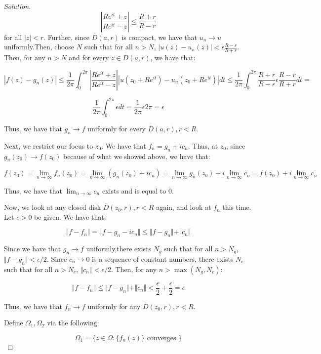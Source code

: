 \documentclass[10pt]{article}
\begin{document}
\begin{proof}[Solution]
$$  \left|  \frac{R e^{it} + z}{R e^{it} - z} \right| \leq \frac{R + r}{R - r} $$ for all $| z| < r$. Further, since $\overline{D}(a,r)$ is compact, we have that $u_n \to u$ uniformly.Then, choose $N$ such that for all $n > N$, $|u(z) - u_n(z)| < \epsilon \frac{R - r}{R + r}$. Then, for any $n > N$ and for every $z \in \overline{D}(a,r)$, we have that:

$$| f(z)  - g_n(z) | \leq  \frac{1}{2\pi}  \int_0^{2\pi} \left|  \frac{R e^{it} + z}{R e^{it} - z} \right| \left|  u(z_0 + Re^{it}) -  u_n(z_0 + Re^{it})\right| dt \leq \frac{1}{2\pi}  \int_0^{2\pi}  \frac{R + r}{R - r} \epsilon \frac{R - r}{R + r}  dt = $$

$$ \frac{1}{2\pi}  \int_0^{2\pi} \epsilon dt = \frac{1}{2\pi} \epsilon 2\pi = \epsilon$$

Thus, we have that $g_n \to f$ uniformly for every $\overline{D}(a,r), r < R$.

Next, we restrict our focus to $z_0$. We have that $f_n = g_n + ic_n$. Thus, at $z_0$, since $g_n(z_0) \to f(z_0)$ because of what we showed above, we have that:

$$ f(z_0) = \lim_{n \to \infty} f_n(z_0) = \lim_{n \to \infty} (g_n(z_0) + i c_n ) = \lim_{n \to \infty} g_n(z_0) + i \lim_{n \to \infty} c_n = f(z_0) + i \lim_{n \to\infty} c_n$$

Thus, we have that $\lim_{n \to \infty} c_n$ exists and is equal to 0.

Now, we look at any closed disk $\overline{D}(z_0,r), r < R$ again, and look at $f_n$ this time. Let $\epsilon > 0$ be given. We have that:

$$ \Vert f - f_n \Vert = \Vert f - g_n - i c_n \Vert \leq \Vert f - g_n \Vert + \Vert c_n \Vert$$

Since we have that $g_n \to f$ uniformly,there exists $N_g$ such that for all $n > N_g$, $\Vert f - g_n \Vert < \epsilon/2$. Since $c_n \to 0$ is a sequence of constant numbers, there exists $N_c$ such that for all $n > N_c$, $\Vert c_n \Vert < \epsilon/2$. Then, for any $n > \max(N_g, N_c)$:

$$ \Vert f - f_n \Vert \leq \Vert f - g_n \Vert + \Vert c_n \Vert <  \frac{\epsilon}{2} + \frac{\epsilon}{2} = \epsilon$$

Thus, we have that $f_n \to f$ uniformly for any $\overline{D}(z_0,r), r < R$.

Define $\Omega_1, \Omega_2$ via the following:

$$\Omega_1 = \{ z \in \Omega : \{ f_n(z) \} \text{ converges } \} $$


\end{proof}
\end{document}

